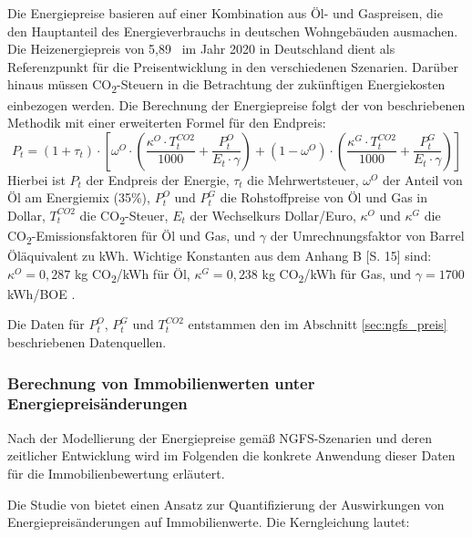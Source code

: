 Die Energiepreise basieren auf einer Kombination aus Öl- und Gaspreisen, die den Hauptanteil des Energieverbrauchs in deutschen Wohngebäuden ausmachen. Die Heizenergiepreis von 5,89~ im Jahr 2020 in Deutschland \parencite{behr2023warmemonitor} dient als Referenzpunkt für die Preisentwicklung in den verschiedenen Szenarien. Darüber hinaus müssen CO\textsubscript{2}-Steuern in die Betrachtung der zukünftigen Energiekosten einbezogen werden. Die Berechnung der Energiepreise folgt der von \textcite{tergerman} beschriebenen Methodik mit einer erweiterten Formel für den Endpreis:
\begin{equation}\label{eq:pt}
P_t = (1 + \tau_t) \cdot [\omega^O \cdot (\frac{\kappa^O \cdot T^{CO2}_t}{1000} + \frac{P^O_t}{E_t \cdot \gamma}) + (1 - \omega^O) \cdot (\frac{\kappa^G \cdot T^{CO2}_t}{1000} + \frac{P^G_t}{E_t \cdot \gamma})]
\end{equation}
Hierbei ist $P_t$ der Endpreis der Energie, $\tau_t$ die Mehrwertsteuer, $\omega^O$ der Anteil von Öl am Energiemix (35\%), $P^O_t$ und $P^G_t$ die Rohstoffpreise von Öl und Gas in Dollar, $T^{CO2}_t$ die CO\textsubscript{2}-Steuer, $E_t$ der Wechselkurs Dollar/Euro, $\kappa^O$ und $\kappa^G$ die CO\textsubscript{2}-Emissionsfaktoren für Öl und Gas, und $\gamma$ der Umrechnungsfaktor von Barrel Öläquivalent zu kWh. Wichtige Konstanten aus dem Anhang B [S. 15] sind: $\kappa^O = 0,287$ kg CO\textsubscript{2}/kWh für Öl, $\kappa^G = 0,238$ kg CO\textsubscript{2}/kWh für Gas, und $\gamma = 1700$ kWh/BOE \parencite{tergerman}. 

Die Daten für $P^O_t$, $P^G_t$ und $T^{CO2}_t$ entstammen den im Abschnitt \ref{sec:ngfs_preis} beschriebenen Datenquellen.

\subsubsection{Berechnung von Immobilienwerten unter Energiepreisänderungen}\label{sec:endenfkt}
Nach der Modellierung der Energiepreise gemäß NGFS-Szenarien und deren zeitlicher Entwicklung wird im Folgenden die konkrete Anwendung dieser Daten für die Immobilienbewertung erläutert.

Die Studie von \parencite{tergerman} bietet einen Ansatz zur Quantifizierung der Auswirkungen von Energiepreisänderungen auf Immobilienwerte. Die Kerngleichung lautet:

